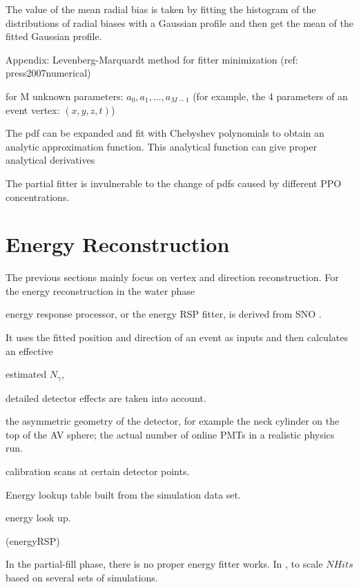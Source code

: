The value of the mean radial bias is taken by fitting the histogram of the distributions of radial biases with a Gaussian profile and then get the mean of the fitted Gaussian profile.



Appendix: Levenberg-Marquardt method for fitter minimization
(ref: press2007numerical)

for M unknown parameters: $a_0, a_1, ... , a_{M-1}$ (for example, the 4 parameters of an event vertex: $(x,y,z,t)$)



The pdf can be expanded and fit with Chebyshev polynomials to obtain an analytic approximation function\cite{press2007numerical}. This analytical function can give proper analytical derivatives



The partial fitter is invulnerable to the change of pdfs caused by different PPO concentrations.


\section{Energy Reconstruction}
 

The previous sections mainly focus on vertex and direction reconstruction. For the energy reconstruction in the water phase 

energy response processor, or the energy RSP fitter, is derived from SNO \cite{boulay2004direct,moffat2001optical}.

It uses the fitted position and direction of an event as inputs and then calculates an effective 

estimated $N_\gamma$,

detailed detector effects are taken into account.

the asymmetric geometry of the detector, for example the neck cylinder on the top of the AV sphere; the actual number of online PMTs in a realistic physics run.





 calibration scans at certain detector points.

Energy lookup table built from the simulation data set.



energy look up\cite{energyRSP}.

(energyRSP)


In the partial-fill phase, there is no proper energy fitter works.  In \cite{partialEnergy}, 
to scale $NHits$ based on several sets of simulations.





